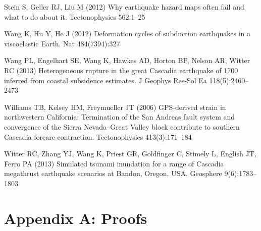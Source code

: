 {\begin{thebibliography}{33}
Stein S, Geller RJ, Liu M (2012) Why earthquake hazard maps often fail and what
  to do about it. Tectonophysics 562:1--25

Wang K, Hu Y, He J (2012) Deformation cycles of subduction earthquakes in a
  viscoelastic {E}arth. Nat 484(7394):327

Wang PL, Engelhart SE, Wang K, Hawkes AD, Horton BP, Nelson AR, Witter RC
  (2013) Heterogeneous rupture in the great {C}ascadia earthquake of 1700
  inferred from coastal subsidence estimates. J Geophys Res-Sol Ea
  118(5):2460--2473

Williams TB, Kelsey HM, Freymueller JT (2006) {GPS}-derived strain in
  northwestern {C}alifornia: Termination of the {S}an {A}ndreas fault system
  and convergence of the {S}ierra {N}evada--{G}reat {V}alley block contribute
  to southern {C}ascadia forearc contraction. Tectonophysics 413(3):171--184

Witter RC, Zhang YJ, Wang K, Priest GR, Goldfinger C, Stimely L, English JT,
  Ferro PA (2013) Simulated tsunami inundation for a range of {C}ascadia
  megathrust earthquake scenarios at {B}andon, {O}regon, {USA}. Geosphere
  9(6):1783--1803

\end{thebibliography}



\section*{Appendix A: Proofs}

}
